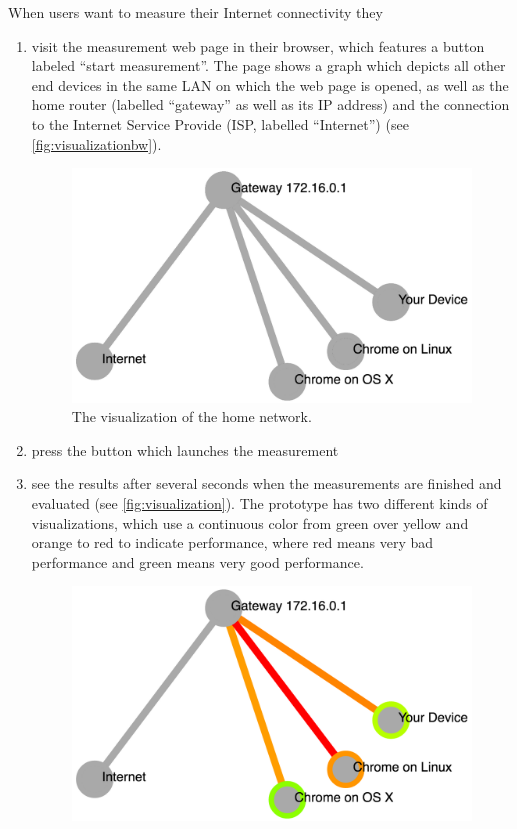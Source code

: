 \documentclass{sig-alternate-10pt}
\begin{document}
When users want to measure their Internet connectivity they
\begin{enumerate}
\item visit the measurement web page in their browser, which features a button labeled ``start measurement''. The page shows a graph which depicts all other end devices in the same LAN on which the web page is opened, as well as the home router (labelled ``gateway'' as well as its IP address) and the connection to the Internet Service Provide (ISP, labelled ``Internet'') (see \autoref{fig:visualizationbw}).
\begin{figure}[tbh]
\begin{center}
\includegraphics[width=\columnwidth]{figures/visualizationbw}
\end{center}
\caption{The visualization of the home network.}\label{fig:visualizationbw}
\end{figure}
\item press the button which launches the measurement
\item see the results after several seconds when the measurements are finished and evaluated (see \autoref{fig:visualization}). The prototype has two different kinds of visualizations, which use a continuous color from green over yellow and orange to red to indicate performance, where red means very bad performance and green means very good performance. 
\begin{figure}[tbh]
\begin{center}
\includegraphics[width=\columnwidth]{figures/visualization}

\end{center}
\end{figure}
\end{enumerate}
\end{document}
